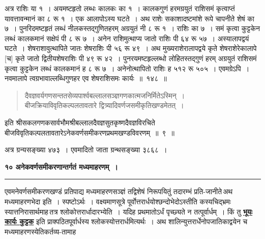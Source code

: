 \documentclass[11pt, openany]{book}
\begin{document}
\newpage
 अत्र राशिः या १~। अयमष्टहृतो लब्धः कालकः का १~। कालकगुणं हरमग्रयुतं राशिसमं कृत्वाप्तं यावत्तावन्मानं का ८ रू १~। एक आलापोऽस्य
घटते~।
 अथ राशेः सकाशादष्टमांशे रूपे चापनीते शेषं का ७~। पुनरिदमष्टहृतं लब्धं
नीलकस्तद्गुणितहरम् अग्रयुतं नी ८ रू १~। राशिः का ७~। समं कृत्वा कुट्टकेन
लब्धं कालकमानं सक्षेपं पी ८ रू ७~। अनेन राशिमुत्थाप्य जातो राशिः पी ६४ रू ५७~। अस्यालापद्वयं घटते~। शेषराशावुत्थापिते जातः शेषराशिः पी ५६ रू ४९~।
 अथ मुख्यराशेरालापद्वये कृते शेषराशेरेकालापे [च] कृते जातो
द्वितीयशेषराशिः पी ४९
 रू ४२~। पुनरयमष्टहृल्लब्धो लोहितस्तद्गुणं हरम् अग्रयुतं राशिसमं कृत्वा
कुट्टकेन
 लब्धं कालकमानं ह ८ रू ७~। अनेनोत्थापितो राशिः ह ५१२ रू ५०५~।
 एवमग्रेऽपि~। नवमालापे त्वग्रभावाल्लब्धिगुणहर एव शेषराशिसमः कार्यः~॥~१४८~॥
 
\begin{quote}
      {\qt दैवज्ञवर्यगणसन्ततसेव्यपार्श्वबल्लालसञ्ज्ञगणकात्मजनिर्मितेऽस्मिन्~। \\
 बीजक्रियाविवृतिकल्पलतावतारे द्वित्र्यादिवर्णजसमीकृतिखण्डमेतत्~।} 
\end{quote}
 
\begin{center}
 इति श्रीसकलगणकसार्वभौमश्रीबल्लालदैवज्ञसुतकृष्णदैवज्ञविरचिते\\ बीजविवृतिकल्पलतावतारेऽनेकवर्णसमीकरणप्रथमखण्डविवरणम्~॥~९~॥~\\
\vspace{4mm}

 अत्र ग्रन्यसङ्ख्या ४७३~। एवमादितो जाता ग्रन्थसङ्ख्या ३८६८~।
\end{center}

\newpage
 \label{ch10}
 \begin{center}
{\LARGE \textbf{१० अनेकवर्णसमीकरणान्तर्गतं मध्यमाहरणम्~।}}\\
     \rule{0.4\linewidth}{0.7pt}
 \end{center}
 
\noindent एवमनेवर्णसमीकरणखण्डं प्रतिपाद्य मध्यमाहरणसञ्ज्ञं तद्विशेषं
निरूपयितुं तदारम्भं प्रति-जानीते\textendash \,अथ मध्यमाहरणभेदा इति~। स्पष्टोऽर्थः~। वक्ष्यमाणसूत्रे
पूर्वोत्तरार्धयोश्छन्दोभेदोऽस्तीति कस्यचिद्भ्रमः स्यात्तनिरासार्थमाह\textendash \,तत्र
श्लोकोत्तरार्धादारभ्येति~। यदिह प्रथमातोऽर्धं पृच्छ्यते न तत्पूर्वार्धम्~। किं
तु \hyperref[134]{\textbf{भूयः कार्यः कुट्टक}} इति प्राक्पठितपूर्वार्धस्य श्लोकस्योत्तरार्धमित्यर्थः~। अथ
शालिन्युत्तरार्धेनोपजातिकाद्वयेन च मध्यमाहरणस्येतिकर्तव्य-तामाह\textendash
{} \label{149}
\end{document}
